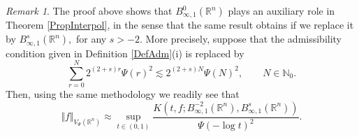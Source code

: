 \documentclass[11pt, a4paper,leqno]{amsart}
\newtheorem{theorem}{Theorem}
\theoremstyle{plain}
\newtheorem{corollary}{Corollary}
\numberwithin{equation}{section}
\theoremstyle{definition}
\theoremstyle{remark}
\newtheorem{remark}{Remark}
\begin{document}
\begin{remark}
\label{Remark16} The proof above shows that $B_{\infty,1}^{0}(\mathbb{R}^{n})$
plays an auxiliary role in Theorem \ref{PropInterpol}, in the sense that the
same result obtains if we replace it by $B_{\infty,1}^{s}(\mathbb{R}^{n}),$
for any $s>-2$. More precisely, suppose that the admissibility condition given in Definition \ref{DefAdm}(i) is replaced by
\[
\sum_{r=0}^{N}2^{(2+s)r}\Psi(r)^{2}\lesssim2^{(2+s)N}\Psi(N)^{2},\qquad
N\in\mathbb{N}_{0}.
\]
Then, using the same methodology we readily see that
\[
\Vert f\Vert_{V_{\Psi}(\mathbb{R}^{n})}\approx\sup_{t\in(0,1)}\frac
{K(t,f;B_{\infty,1}^{-2}(\mathbb{R}^{n}),B_{\infty,1}^{s}(\mathbb{R}^{n}%
))}{\Psi(-\log t)^{2}}.
\]

\end{remark}
%
%
%
%
%
\end{document}
